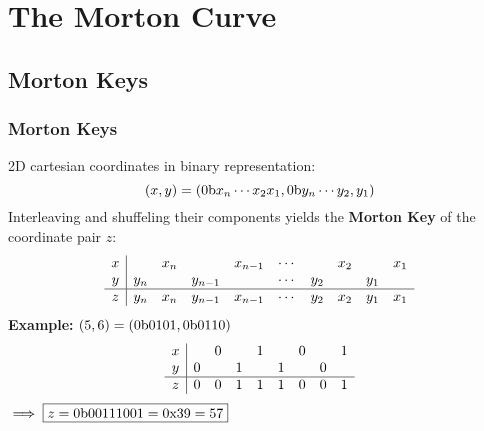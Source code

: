 \section{The Morton Curve}
\subsection{Morton Keys}
\begin{frame}
    \frametitle{Morton Keys}
    2D cartesian coordinates in binary representation:
    \begin{equation}
        \left( x, y \right) = \left( 0\textrm{b} x_n \cdots x_2 x_1, 0\textrm{b} y_n \cdots
        y_2, y_1 \right)
    \end{equation}
    Interleaving and shuffeling their components yields the \textbf{Morton Key}
    of the coordinate pair $z$:
    \begin{equation}
        \begin{array} {c|c c c c c c c c c}
            x & & x_n & & x_{n-1} & \cdots & & x_2 & & x_1 \\
            y & y_n & & y_{n-1} & & \cdots & y_2 & & y_1 \\
            \hline
            z & y_n & x_n & y_{n-1} & x_{n-1} & \cdots & y_2 & x_2 & y_1 & x_1
        \end{array}
    \end{equation}
    \textbf{Example:}
    $\left( 5, 6 \right)=\left(0\textrm{b} 0 1 0 1, 0\textrm{b} 0 1 1 0\right)$
    \begin{equation}
        \begin{array} {c|c c c c c c c c c}
            x & & 0 & & 1 & & 0 & & 1 \\
            y & 0 & & 1 & & 1 & & 0 \\
            \hline
            z & 0 & 0 & 1 & 1 & 1 & 0 & 0 & 1
        \end{array}
    \end{equation}
    $\implies\boxed{z=0\textrm{b}00111001=0\textrm{x}39=57}$
\end{frame}

